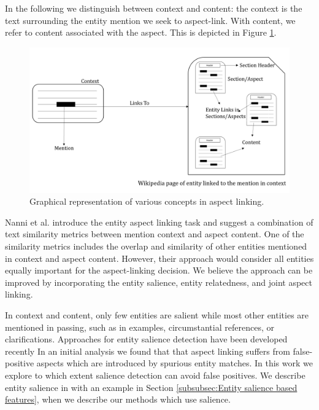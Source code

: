 In the following we distinguish between context and content: the context is the text surrounding the entity mention we seek to aspect-link. With content, we refer to content associated with the aspect. This is depicted in Figure \ref{fig:context-vs-content}.

\begin{figure}
    \centering
    \includegraphics [scale=0.5]{context-and-content.png}
    \caption{Graphical representation of various concepts in aspect linking.}
    \label{fig:context-vs-content}
\end{figure}

Nanni et al. \cite{nanni2018entity} introduce the entity aspect linking task and suggest a combination of text similarity metrics between mention context and aspect content. One of the similarity metrics includes the overlap and similarity of other entities mentioned in context and aspect content. However, their approach would consider all entities equally important for the aspect-linking decision. We believe the approach can be improved by incorporating the entity salience, entity relatedness, and joint aspect linking.  

In context and content, only few entities are salient while most other entities are mentioned in passing, such as in examples, circumstantial references, or clarifications. Approaches for entity salience detection have been developed  recently \cite{dunietz-gillick-2014-new, xiong2018towards, swat} %
 In an initial analysis we found that that aspect linking suffers from false-positive aspects which are introduced by spurious entity matches. In this work we explore to which extent salience detection can avoid false positives. We describe entity salience in with an example in Section \ref{subsubsec:Entity salience based features}, when we describe our methods which use salience.

